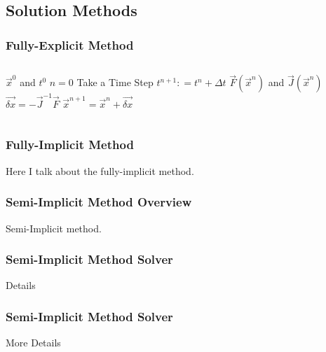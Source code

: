 \documentclass[compress,xcolor=table]{beamer}
\begin{document}
\subsection[Solution Methods]{Solution Methods}
\begin{frame}
\frametitle{Fully-Explicit Method}

\begin{columns}


\begin{algorithmic}
\Require $\vec{x}^{0}$ and $t^{0}$
\Set $n = 0$
\Loop \; Take a Time Step
    \State $t^{n+1} : = t^{n} + \Delta t$
    \Calculate $\vec{F}(\vec{x}^n)$ and $\vec{J}(\vec{x}^n)$
    \Calculate $\vec{\delta x} = -\vec{J}^{-1}\vec{F}$
    \Calculate $\vec{x}^{n+1} = \vec{x}^{n} + \vec{\delta x}$ 
\end{algorithmic}

\end{columns}

\end{frame}
\begin{frame}
\frametitle{Fully-Implicit Method}

Here I talk about the fully-implicit method.

\end{frame}
\begin{frame}
\frametitle{Semi-Implicit Method Overview}

Semi-Implicit method.

\end{frame}
\begin{frame}
\frametitle{Semi-Implicit Method Solver}

Details

\end{frame}
\begin{frame}
\frametitle{Semi-Implicit Method Solver}

More Details

\end{frame}
\end{document}

